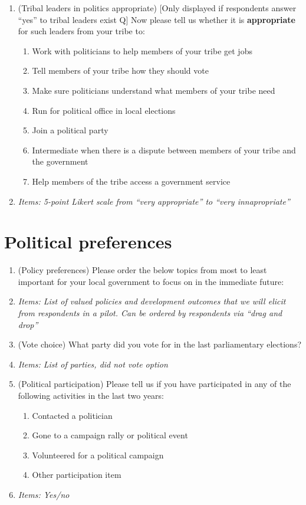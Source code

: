\documentclass[12pt]{article}
\newcommand{\alerta}[1]{\textcolor{harvardcrimson}{#1}}
\begin{document}
\begin{enumerate}
     \item \alerta{(Tribal leaders in politics appropriate)} [Only displayed if respondents answer ``yes'' to tribal leaders exist Q]  Now please tell us whether it is \textbf{appropriate} for such leaders from your tribe to:
     \begin{enumerate}
         \item Work with politicians to help members of your tribe get jobs 
         \item Tell members of your tribe how they should vote
         \item Make sure politicians understand what members of your tribe need
         \item Run for political office in local elections
         \item Join a political party
         \item Intermediate when there is a dispute between members of your tribe and the government 
         \item Help members of the tribe access a government service
     \end{enumerate}
    \item[] \textit{Items: 5-point Likert scale from ``very appropriate'' to ``very innapropriate''}
\end{enumerate}
\section*{Political preferences}
\begin{enumerate}
   \item \alerta{(Policy preferences)}  Please order the below topics from most to least important for your local government to focus on in the immediate future:
    \item[] \textit{Items: List of valued policies and development outcomes that we will elicit from respondents in a pilot. Can be ordered by respondents via ``drag and drop''}
    
    \item \alerta{(Vote choice)}  What party did you vote for in the last parliamentary elections?
    \item[] \textit{Items: List of parties, did not vote option}
    
    \item \alerta{(Political participation)}  Please tell us if you have participated in any of the following activities in the last two years:
    \begin{enumerate}
        \item Contacted a politician
        \item Gone to a campaign rally or political event
        \item Volunteered for a political campaign
        \item Other participation item
    \end{enumerate}
    
    \item[] \textit{Items: Yes/no}

\end{enumerate}
\end{document}
